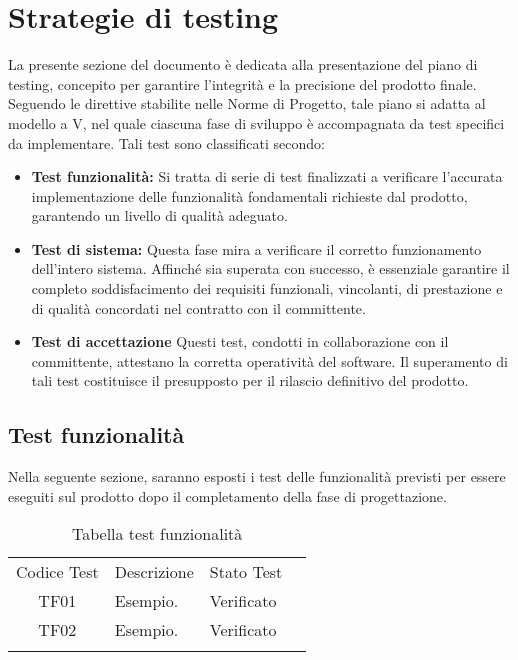 \section{Strategie di testing}
La presente sezione del documento è dedicata alla presentazione del piano di testing, concepito per garantire l'integrità e la precisione del prodotto finale. Seguendo le direttive stabilite nelle Norme di Progetto, tale piano si adatta al modello a V, nel quale ciascuna fase di sviluppo è accompagnata da test specifici da implementare. Tali test sono classificati secondo:
\begin{itemize}
    \item \textbf{Test funzionalità:} Si tratta di serie di test finalizzati a verificare l'accurata implementazione delle funzionalità fondamentali richieste dal prodotto, garantendo un livello di qualità adeguato.
    \item \textbf{Test di sistema:} Questa fase mira a verificare il corretto funzionamento dell'intero sistema. Affinché sia superata con successo, è essenziale garantire il completo soddisfacimento dei requisiti funzionali, vincolanti, di prestazione e di qualità concordati nel contratto con il committente.
    \item \textbf{Test di accettazione} Questi test, condotti in collaborazione con il committente, attestano la corretta operatività del software. Il superamento di tali test costituisce il presupposto per il rilascio definitivo del prodotto.
\end{itemize}
\subsection{Test funzionalità}
Nella seguente sezione, saranno esposti i test delle funzionalità previsti per essere eseguiti sul prodotto dopo il completamento della fase di progettazione.
\\
\begin{table}[htbp]
    \centering
    \begin{tabular}{|c|p{3cm}|p{5cm}|c|}
        \hhline{----}
        Codice Test & Descrizione & Stato Test \\
        \hhline{---}
        TF01 & Esempio. & Verificato \\
        \hhline{----}
        TF02 & Esempio. & Verificato \\
        \hhline{----}
    \end{tabular}
    \caption{Tabella test funzionalità}
    \label{tab:testsFunzionalità}
\end{table}
\\

